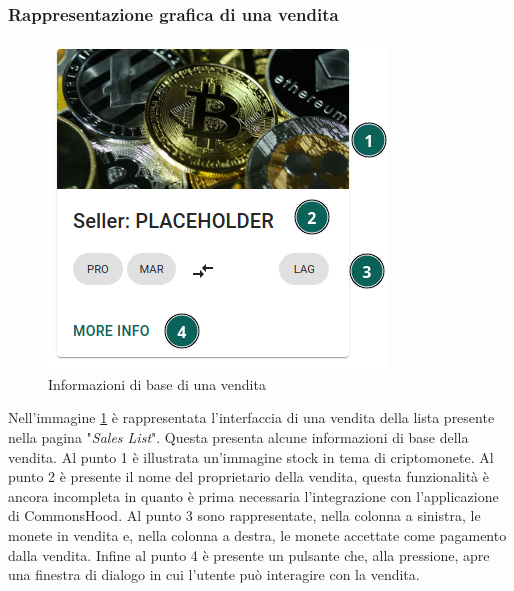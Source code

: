 \documentclass[a4paper]{article}
\begin{document}
        \subsubsection{Rappresentazione grafica di una vendita}
        \label{moreInfo}
        \begin{figure}[H]
          \includegraphics[scale=0.7]{sale.png}
          \centering
          \caption{Informazioni di base di una vendita}
          \centering
          \label{fig:sale}
        \end{figure}
        Nell'immagine \ref{fig:sale} è rappresentata l'interfaccia di una vendita della lista presente nella pagina "\emph{Sales List}". Questa presenta alcune informazioni di base della vendita.
        Al punto 1 è illustrata un'immagine stock in tema di criptomonete. Al punto 2 è presente il nome del proprietario della vendita, questa funzionalità è ancora incompleta in quanto è prima necessaria l'integrazione con l'applicazione di CommonsHood.
        Al punto 3 sono rappresentate, nella colonna a sinistra, le monete in vendita e, nella colonna a destra, le monete accettate come pagamento dalla vendita. Infine al punto 4 è presente un pulsante che, alla pressione, apre una finestra di dialogo in cui l'utente può interagire con la vendita.
\end{document}
